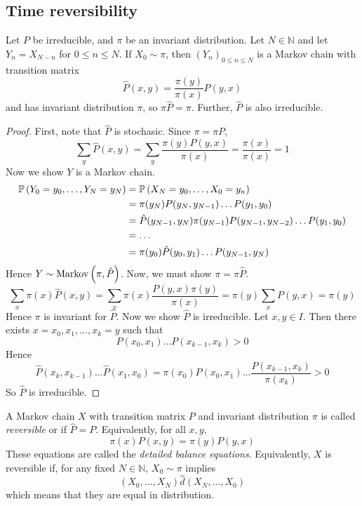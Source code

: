 \subsection{Time reversibility}
\begin{theorem}
	Let \( P \) be irreducible, and \( \pi \) be an invariant distribution.
	Let \( N \in \mathbb N \) and let \( Y_n = X_{N-n} \) for \( 0 \leq n \leq N \).
	If \( X_0 \sim \pi \), then \( (Y_n)_{0 \leq n \leq N} \) is a Markov chain with transition matrix
	\[
		\hat P(x,y) = \frac{\pi(y)}{\pi(x)} P(y,x)
	\]
	and has invariant distribution \( \pi \), so \( \pi \hat P = \pi \).
	Further, \( \hat P \) is also irreducible.
\end{theorem}
\begin{proof}
	First, note that \( \hat P \) is stochasic.
	Since \( \pi = \pi P \),
	\[
		\sum_y \hat P(x,y) = \sum_y \frac{\pi(y) P(y,x)}{\pi(x)} = \frac{\pi(x)}{\pi(x)} = 1
	\]
	Now we show \( Y \) is a Markov chain.
	\begin{align*}
		\mathbb{P}\left({Y_0 = y_0, \dots, Y_N = y_N}\right) & = \mathbb{P}\left({X_N = y_0, \dots, X_0 = y_n}\right)                                      \\
		                                   & = \pi(y_N) P(y_N, y_{N-1}) \dots P(y_1, y_0)                              \\
		                                   & = \hat P(y_{N-1}, y_N) \pi(y_{N-1}) P(y_{N-1}, y_{N-2}) \dots P(y_1, y_0) \\
		                                   & = \dots                                                                   \\
		                                   & = \pi(y_0) \hat P(y_0, y_1) \dots P(y_{N-1}, y_N)
	\end{align*}
	Hence \( Y \sim \operatorname{Markov}\left({\pi, \hat P}\right) \).
	Now, we must show \( \pi = \pi \hat P \).
	\[
		\sum_x \pi(x) \hat P(x,y) = \sum_x \pi(x) \frac{P(y,x) \pi(y)}{\pi(x)} = \pi(y) \sum_x P(y,x) = \pi(y)
	\]
	Hence \( \pi \) is invariant for \( \hat P \).
	Now we show \( \hat P \) is irreducible.
	Let \( x,y \in I \).
	Then there exists \( x = x_0, x_1, \dots, x_k = y \) such that
	\[
		P(x_0, x_1) \dots P(x_{k-1}, x_k) > 0
	\]
	Hence
	\[
		\hat P(x_k, x_{k-1}) \dots \hat P(x_1, x_0) = \pi(x_0) P(x_0, x_1) \dots \frac{P(x_{k-1}, x_k)}{\pi(x_k)} > 0
	\]
	So \( \hat P \) is irreducible.
\end{proof}
\begin{definition}
	A Markov chain \( X \) with transition matrix \( P \) and invariant distribution \( \pi \) is called \textit{reversible} or  if \( \hat P = P \).
	Equivalently, for all \( x, y \),
	\[
		\pi(x) P(x,y) = \pi(y) P(y,x)
	\]
	These equations are called the \textit{detailed balance equations}.
	Equivalently, \( X \) is reversible if, for any fixed \( N \in \mathbb N \), \( X_0 \sim \pi \) implies
	\[
		(X_0, \dots, X_N) \overset{=}{d} (X_N, \dots, X_0)
	\]
	which means that they are equal in distribution.
\end{definition}
